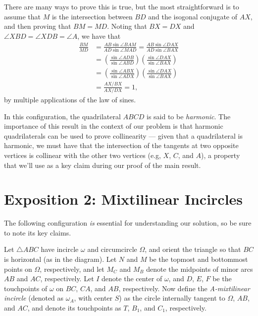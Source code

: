 There are many ways to prove this is true, but the most straightforward is to assume that $M$ is the intersection between $BD$ and the isogonal conjugate of $AX$, and then proving that $BM=MD$. Noting that $BX = DX$ and $\angle{XBD} = \angle{XDB} = \angle{A}$, we have that 
\begin{align*}
    \frac{BM}{MD} &= \frac{AB\sin{\angle{BAM}}}{AD\sin{\angle{MAD}}} = \frac{AB\sin{\angle{DAX}}}{AD\sin{\angle{BAX}}}\\
    &= \left(\frac{\sin{\angle{ADB}}}{\sin{\angle{ABD}}}\right) \left(\frac{\sin{\angle{DAX}}}{\sin{\angle{BAX}}}\right)\\
    &= \left(\frac{\sin{\angle{ABX}}}{\sin{\angle{ADX}}}\right)\left(\frac{\sin{\angle{DAX}}}{\sin{\angle{BAX}}}\right)\\
    &= \frac{AX/BX}{AX/DX} = 1,
\end{align*}
by multiple applications of the law of sines.\V

In this configuration, the quadrilateral $ABCD$ is said to be \textit{harmonic}. The importance of this result in the context of our problem is that harmonic quadrilaterals can be used to prove collinearity — given that a quadrilateral is harmonic, we must have that the intersection of the tangents at two opposite vertices is collinear with the other two vertices (e.g, $X$, $C$, and $A$), a property that we'll use as a key claim during our proof of the main result.

\section*{Exposition 2: Mixtilinear Incircles}

The following configuration \textit{is} essential for understanding our solution, so be sure to note its key claims.\V

Let $\triangle{ABC}$ have incircle $\omega$ and circumcircle $\Omega$, and orient the triangle so that $BC$ is horizontal (as in the diagram). Let $N$ and $M$ be the topmost and bottommost points on $\Omega$, respectively, and let $M_C$ and $M_B$ denote the midpoints of minor arcs $AB$ and $AC$, respectively. Let $I$ denote the center of $\omega$, and $D$, $E$, $F$ be the touchpoints of $\omega$ on $BC$, $CA$, and $AB$, respectively. Now define the \textit{A-mixtilinear incircle} (denoted as $\omega_A$, with center $S$) as the circle internally tangent to $\Omega$, $AB$, and $AC$, and denote its touchpoints as $T$, $B_1$, and $C_1$, respectively. 

